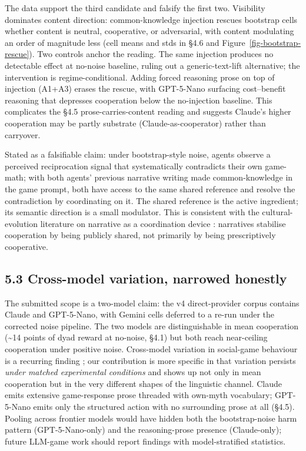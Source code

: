 \documentclass[10pt,letterpaper]{article}
\begin{document}
The data support the third candidate and falsify the first two.
Visibility dominates content direction: common-knowledge injection
rescues bootstrap cells whether content is neutral, cooperative, or
adversarial, with content modulating an order of magnitude less (cell
means and stds in §4.6 and Figure~\ref{fig-bootstrap-rescue}). Two
controls anchor the reading. The same injection produces no detectable
effect at no-noise baseline, ruling out a generic-text-lift alternative;
the intervention is regime-conditional. Adding forced reasoning prose on
top of injection (A1+A3) erases the rescue, with GPT-5-Nano surfacing
cost--benefit reasoning that depresses cooperation below the
no-injection baseline. This complicates the §4.5 prose-carries-content
reading and suggests Claude's higher cooperation may be partly substrate
(Claude-as-cooperator) rather than carryover.

Stated as a falsifiable claim: under bootstrap-style noise, agents
observe a perceived reciprocation signal that systematically contradicts
their own game-math; with both agents' previous narrative writing made
common-knowledge in the game prompt, both have access to the same shared
reference and resolve the contradiction by coordinating on it. The
shared reference is the active ingredient; its semantic direction is a
small modulator. This is consistent with the cultural-evolution
literature on narrative as a coordination device \citep{boyd2011, chwe2001}: narratives stabilise cooperation by being publicly
shared, not primarily by being prescriptively cooperative.

\subsection{5.3 Cross-model variation, narrowed
honestly}\label{cross-model-variation-narrowed-honestly}

The submitted scope is a two-model claim: the v4 direct-provider corpus
contains Claude and GPT-5-Nano, with Gemini cells deferred to a re-run
under the corrected noise pipeline. The two models are distinguishable
in mean cooperation (\textasciitilde14 points of dyad reward at
no-noise, §4.1) but both reach near-ceiling cooperation under positive
noise. Cross-model variation in social-game behaviour is a recurring
finding \citep{fontana2024, leng2023, serapio2023}; our contribution is more specific in that variation
persists \emph{under matched experimental conditions} and shows up not
only in mean cooperation but in the very different shapes of the
linguistic channel. Claude emits extensive game-response prose threaded
with own-myth vocabulary; GPT-5-Nano emits only the structured action
with no surrounding prose at all (§4.5). Pooling across frontier models
would have hidden both the bootstrap-noise harm pattern
(GPT-5-Nano-only) and the reasoning-prose presence (Claude-only); future
LLM-game work should report findings with model-stratified statistics.
\end{document}
